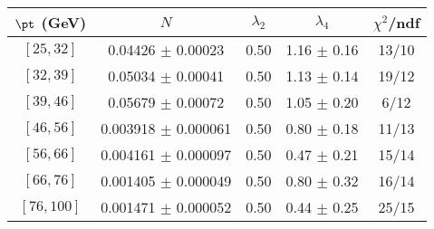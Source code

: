\begin{tabular}{c||c|c|c|c}
$\pt$ (GeV) & $N$ & $\lambda_{2}$ & $\lambda_4$  & $\chi^2$/ndf  \\
\hline
$[25, 32]$ & 0.04426 $\pm$ 0.00023 & 0.50 & 1.16 $\pm$ 0.16 & 13/10\\
$[32, 39]$ & 0.05034 $\pm$ 0.00041 & 0.50 & 1.13 $\pm$ 0.14 & 19/12\\
$[39, 46]$ & 0.05679 $\pm$ 0.00072 & 0.50 & 1.05 $\pm$ 0.20 & 6/12\\
$[46, 56]$ & 0.003918 $\pm$ 0.000061 & 0.50 & 0.80 $\pm$ 0.18 & 11/13\\
$[56, 66]$ & 0.004161 $\pm$ 0.000097 & 0.50 & 0.47 $\pm$ 0.21 & 15/14\\
$[66, 76]$ & 0.001405 $\pm$ 0.000049 & 0.50 & 0.80 $\pm$ 0.32 & 16/14\\
$[76, 100]$ & 0.001471 $\pm$ 0.000052 & 0.50 & 0.44 $\pm$ 0.25 & 25/15\\
\end{tabular}
